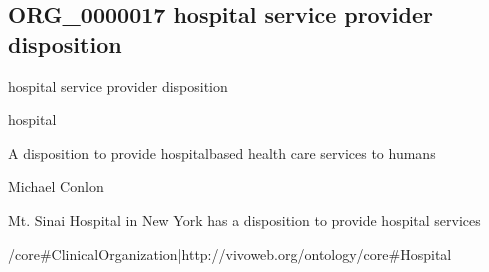 \documentclass[letterpaper,10pt,english]{sphinxmanual}
\begin{document}
\subsection{ORG\_0000017 \sphinxhyphen{} hospital service provider disposition}
\label{\detokenize{doc-ORG_0000017:org-0000017-hospital-service-provider-disposition}}\label{\detokenize{doc-ORG_0000017:index-0}}\label{\detokenize{doc-ORG_0000017::doc}}
\begin{sphinxShadowBox}

\sphinxAtStartPar
hospital service provider disposition
\end{sphinxShadowBox}

\begin{sphinxShadowBox}

\sphinxAtStartPar
hospital
\end{sphinxShadowBox}

\begin{sphinxShadowBox}

\sphinxAtStartPar
{\hyperref[\detokenize{doc-ORG_0000010::doc}]{}}
\end{sphinxShadowBox}

\begin{sphinxShadowBox}

\sphinxAtStartPar
A disposition to provide hospital\sphinxhyphen{}based health care services to humans
\end{sphinxShadowBox}

\begin{sphinxShadowBox}

\sphinxAtStartPar
Michael Conlon 
\end{sphinxShadowBox}

\begin{sphinxShadowBox}

\sphinxAtStartPar
Mt. Sinai Hospital in New York has a disposition to provide hospital services
\end{sphinxShadowBox}

\begin{sphinxShadowBox}

\sphinxAtStartPar
{}/core\#ClinicalOrganization|http://vivoweb.org/ontology/core\#Hospital
\end{sphinxShadowBox}
\end{document}

